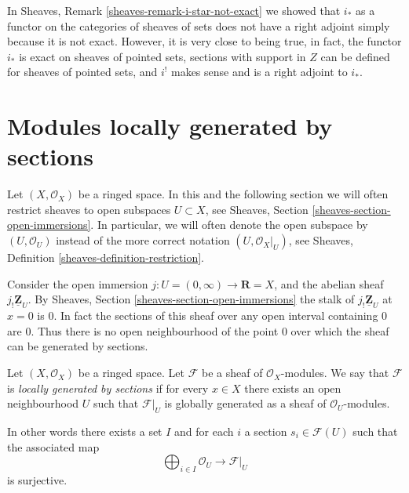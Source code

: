 \begin{remark}
\label{remark-i-star-right-adjoint}
In Sheaves, Remark \ref{sheaves-remark-i-star-not-exact}
we showed that $i_*$ as a functor
on the categories of sheaves of sets
does not have a right adjoint simply because
it is not exact. However, it is very close to being
true, in fact, the functor $i_*$ is exact on sheaves
of pointed sets, sections with support in $Z$ can
be defined for sheaves of pointed sets, and $i^!$
makes sense and is a right adjoint to $i_*$.
\end{remark}











\section{Modules locally generated by sections}
\label{section-locally-generated}

\noindent
Let $(X, \mathcal{O}_X)$ be a ringed space.
In this and the following section we will often restrict
sheaves to open subspaces $U \subset X$, see
Sheaves, Section \ref{sheaves-section-open-immersions}.
In particular, we will often denote the open subspace
by $(U, \mathcal{O}_U)$ instead of the more correct
notation $(U, \mathcal{O}_X|_U)$, see
Sheaves, Definition \ref{sheaves-definition-restriction}.

\medskip\noindent
Consider the open immersion
$j : U = (0 , \infty) \to \mathbf{R} = X$, and the abelian sheaf
$j_!\underline{\mathbf{Z}}_U$. By Sheaves, Section
\ref{sheaves-section-open-immersions} the stalk of
$j_!\underline{\mathbf{Z}}_U$ at $x = 0$ is $0$. In fact the
sections of this sheaf over any open interval containing $0$
are $0$. Thus there is no open neighbourhood of the point
$0$ over which the sheaf can be generated by sections.

\begin{definition}
\label{definition-locally-generated}
Let $(X, \mathcal{O}_X)$ be a ringed space.
Let $\mathcal{F}$ be a sheaf of $\mathcal{O}_X$-modules.
We say that $\mathcal{F}$ is {\it locally generated by sections}
if for every $x \in X$ there exists an open
neighbourhood $U$ such that $\mathcal{F}|_U$
is globally generated as a sheaf of $\mathcal{O}_U$-modules.
\end{definition}

\noindent
In other words there exists a set $I$ and for
each $i$ a section $s_i \in \mathcal{F}(U)$ such
that the associated map
$$
\bigoplus\nolimits_{i \in I} \mathcal{O}_U
\longrightarrow
\mathcal{F}|_U
$$
is surjective.

